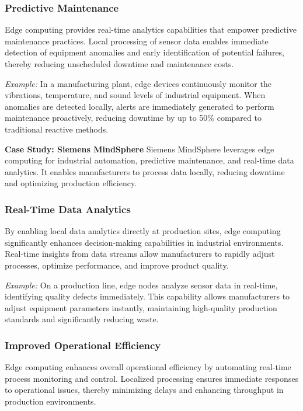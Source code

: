 \documentclass[runningheads]{llncs}
\begin{document}
\subsubsection{Predictive Maintenance}
Edge computing provides real-time analytics capabilities that empower predictive maintenance practices. Local processing of sensor data enables immediate detection of equipment anomalies and early identification of potential failures, thereby reducing unscheduled downtime and maintenance costs.

\noindent\textit{Example:} In a manufacturing plant, edge devices continuously monitor the vibrations, temperature, and sound levels of industrial equipment. When anomalies are detected locally, alerts are immediately generated to perform maintenance proactively, reducing downtime by up to 50\% compared to traditional reactive methods.

\noindent\textbf{Case Study: Siemens MindSphere}
Siemens MindSphere leverages edge computing for industrial automation, predictive maintenance, and real-time data analytics. It enables manufacturers to process data locally, reducing downtime and optimizing production efficiency.

\subsubsection{Real-Time Data Analytics}
By enabling local data analytics directly at production sites, edge computing significantly enhances decision-making capabilities in industrial environments. Real-time insights from data streams allow manufacturers to rapidly adjust processes, optimize performance, and improve product quality.

\noindent\textit{Example:} On a production line, edge nodes analyze sensor data in real-time, identifying quality defects immediately. This capability allows manufacturers to adjust equipment parameters instantly, maintaining high-quality production standards and significantly reducing waste.

\subsubsection{Improved Operational Efficiency}
Edge computing enhances overall operational efficiency by automating real-time process monitoring and control. Localized processing ensures immediate responses to operational issues, thereby minimizing delays and enhancing throughput in production environments.
\end{document}
